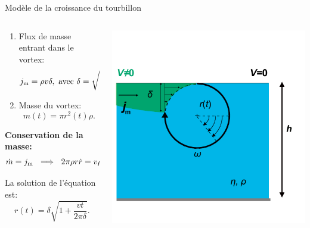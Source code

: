 \documentclass[aspectratio=169,10pt]{beamer}
\begin{document}
\begin{frame}{Modèle de la croissance du tourbillon}
  \begin{columns}
    \begin{column}{.5\textwidth}
       \begin{enumerate}
      \item Flux de masse entrant dans le vortex:
      $$j_{\rm m}=\rho v \delta,~\text{avec}~ \delta = \sqrt{\frac{\nu R}{v}};$$
      \item Masse du vortex: 
      $$m(t)=\pi r^{2}(t)\rho.$$
      \end{enumerate}
      \textbf{Conservation de la masse:} 
      \[ \dot{m}=j_{\rm m}~  \implies~ 2\pi \rho r\dot{r}=v\rho\delta. \]
      
      \vspace{-.5cm}\begin{ombretheo}
          \begin{theo}
      La solution de l'équation est:
      \begin{equation}
          r(t)=\delta\sqrt{1+\frac{vt}{2\pi\delta}}.
      \end{equation}
  \end{theo}
\end{ombretheo}
    \end{column}
    \begin{column}{.55\textwidth}
      \centering
      \includegraphics[width=.8\textwidth]{./figures/Schema_enroulement_v3.pdf}
    \end{column}
  \end{columns}
\end{frame}
\end{document}
